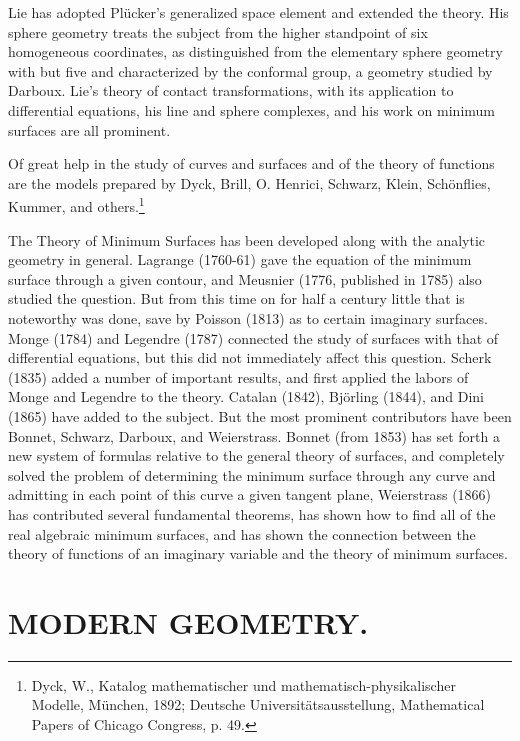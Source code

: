 \documentclass[oneside]{book}
\begin{document}
{Lie has adopted Pl\"ucker's generalized space element and extended the
theory. His sphere geometry treats the subject from the higher
standpoint of six homogeneous coordinates, as distinguished from the
elementary sphere geometry with but five and characterized by the
conformal group, a geometry studied by Darboux. Lie's theory of
contact transformations, with its application to differential
equations, his line and sphere complexes, and his work on minimum
surfaces are all prominent.

Of great help in the study of curves and surfaces and of the theory
of functions are the models prepared by Dyck, Brill, O. Henrici,
Schwarz, Klein, Sch\"onflies, Kummer, and others.\footnote{Dyck,
W., Katalog mathematischer und mathematisch-physikalischer Modelle,
M\"unchen, 1892; Deutsche Universit\"atsausstellung, Mathematical
Papers of Chicago Congress, p. 49.}

The Theory of Minimum Surfaces has been developed along with the
analytic geometry in general. Lagrange (1760-61) gave the equation
of the minimum surface through a given contour, and Meusnier (1776,
published in 1785) also studied the question. But from this time on
for half a century little that is noteworthy was done, save by
Poisson (1813) as to certain imaginary surfaces. Monge (1784) and
Legendre (1787) connected the study of surfaces with that of
differential equations, but this did not immediately affect this
question. Scherk (1835) added a number of important results, and
first applied the labors of Monge and Legendre to the
theory. Catalan (1842), Bj\"orling (1844), and Dini (1865) have added
to the subject. But the most prominent contributors have been
Bonnet, Schwarz, Darboux, and Weierstrass. Bonnet (from 1853) has
set forth a new system of formulas relative to the general theory of
surfaces, and completely solved the problem of determining the
minimum surface through any curve and admitting in each point of
this curve a given tangent plane, Weierstrass (1866) has contributed
several fundamental theorems, has shown how to find all of the real
algebraic minimum surfaces, and has shown the connection between the
theory of functions of an imaginary variable and the theory of
minimum surfaces.

\chapter{MODERN GEOMETRY.}

}
\end{document}
